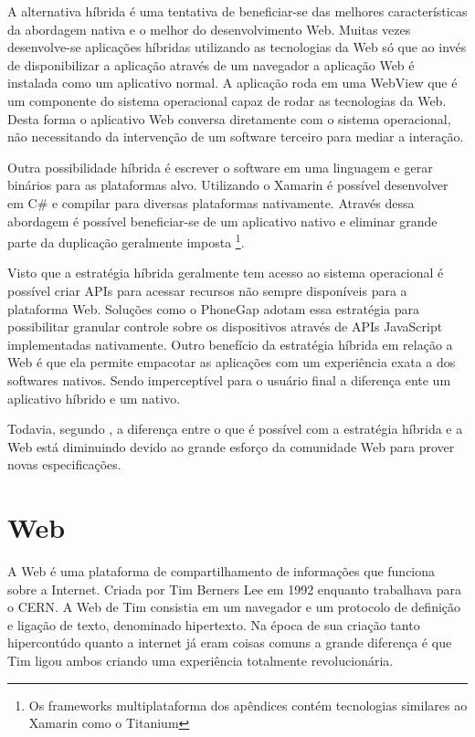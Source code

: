 A alternativa híbrida é uma tentativa de beneficiar-se das melhores
características da abordagem nativa e o melhor do desenvolvimento
Web. Muitas vezes desenvolve-se aplicações híbridas utilizando as
tecnologias da Web só que ao invés de disponibilizar a aplicação
através de um navegador a aplicação Web é instalada como um
aplicativo normal. A aplicação roda em uma WebView que é um
componente do sistema operacional capaz de rodar as tecnologias da
Web. Desta forma o aplicativo Web conversa diretamente com o sistema
operacional, não necessitando da intervenção de um software terceiro
para mediar a interação.

Outra possibilidade híbrida é escrever o software em uma linguagem
e gerar binários para as plataformas alvo. Utilizando o Xamarin é
possível desenvolver em C\# e compilar para diversas plataformas
nativamente. Através dessa abordagem é possível beneficiar-se de um
aplicativo nativo e eliminar grande parte da duplicação geralmente
imposta \footnote{Os frameworks multiplataforma dos apêndices contém
tecnologias similares ao Xamarin como o Titanium}.

Visto que a estratégia híbrida geralmente tem acesso ao sistema
operacional é possível criar APIs para acessar recursos não sempre
disponíveis para a plataforma Web. Soluções como o PhoneGap
adotam essa estratégia para possibilitar granular controle sobre os
dispositivos através de APIs JavaScript implementadas nativamente.
Outro benefício da estratégia híbrida em relação a Web é que
ela permite empacotar as aplicações com um experiência exata a
dos softwares nativos. Sendo imperceptível para o usuário final a
diferença ente um aplicativo híbrido e um nativo.

Todavia, segundo \citet[p. 8]{aSeriousContender}, a diferença entre o
que é possível com a estratégia híbrida e a Web está diminuindo
devido ao grande esforço da comunidade Web para prover novas
especificações.

\section{Web}
A Web é uma plataforma de compartilhamento de informações que
funciona sobre a Internet. Criada por Tim Berners Lee em 1992 enquanto
trabalhava para o CERN. A Web de Tim consistia em um navegador e um
protocolo de definição e ligação de texto, denominado hipertexto. Na
época de sua criação tanto hipercontúdo quanto a internet já eram
coisas comuns a grande diferença é que Tim ligou ambos criando uma
experiência totalmente revolucionária.

